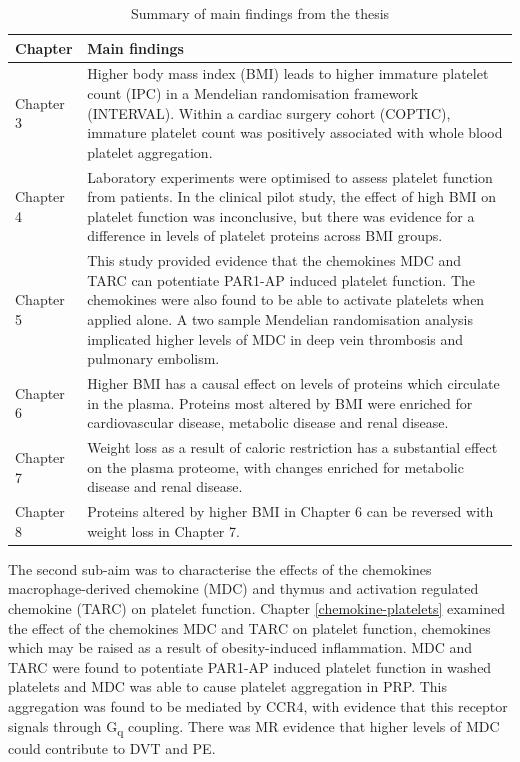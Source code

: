 \documentclass[11pt,twoside]{bristolthesis}
\begin{document}
\begin{table}

\caption{\label{tab:main-thesis-findings}Summary of main findings from the thesis}
\centering
\begin{tabu} to 
\toprule
Chapter & Main findings\\
\midrule
Chapter 3 & Higher body mass index (BMI) leads to higher immature platelet count (IPC) in a Mendelian randomisation framework (INTERVAL). Within a cardiac surgery cohort (COPTIC), immature platelet count was positively associated with whole blood platelet aggregation.\\
Chapter 4 & Laboratory experiments were optimised to assess platelet function from patients. In the clinical pilot study, the effect of high BMI on platelet function was inconclusive, but there was evidence for a difference in levels of platelet proteins across BMI groups.\\
Chapter 5 & This study provided evidence that the chemokines MDC and TARC can potentiate PAR1-AP induced platelet function. The chemokines were also found to be able to activate platelets when applied alone. A two sample Mendelian randomisation analysis implicated higher levels of MDC in deep vein thrombosis and pulmonary embolism.\\
Chapter 6 & Higher BMI has a causal effect on levels of proteins which circulate in the plasma. Proteins most altered by BMI were enriched for cardiovascular disease, metabolic disease and renal disease.\\
Chapter 7 & Weight loss as a result of caloric restriction has a substantial effect on the plasma proteome, with changes enriched for metabolic disease and renal disease.\\
\addlinespace
Chapter 8 & Proteins altered by higher BMI in Chapter 6 can be reversed with weight loss in Chapter 7.\\
\bottomrule
\end{tabu}
\end{table}
The second sub-aim was to characterise the effects of the chemokines macrophage-derived chemokine (MDC) and thymus and activation regulated chemokine (TARC) on platelet function. Chapter \ref{chemokine-platelets} examined the effect of the chemokines MDC and TARC on platelet function, chemokines which may be raised as a result of obesity-induced inflammation. MDC and TARC were found to potentiate PAR1-AP induced platelet function in washed platelets and MDC was able to cause platelet aggregation in PRP. This aggregation was found to be mediated by CCR4, with evidence that this receptor signals through G\textsubscript{q} coupling. There was MR evidence that higher levels of MDC could contribute to DVT and PE.
\end{document}
